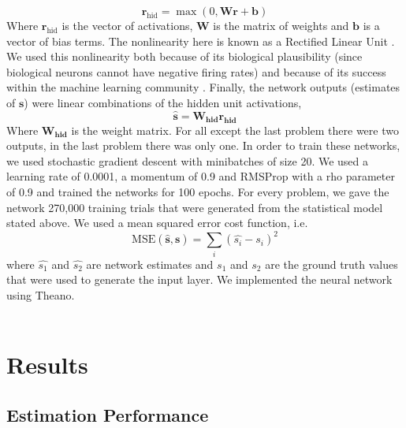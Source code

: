 \documentclass{article} %
\begin{document}
\begin{equation}
	\mathbf{r}_{\text{hid}} = \max(0, \mathbf{Wr + b})
\end{equation}
Where $\mathbf{r}_{\text{hid}}$ is the vector of activations, $\mathbf{W}$ is the matrix of weights and $\mathbf{b}$ is a vector of bias terms. The nonlinearity here is known as a Rectified Linear Unit \cite{NairH10}.
We used this nonlinearity both because of its biological plausibility (since biological neurons cannot have negative firing rates) and because of its success within the machine learning community \cite{Maas2013}.
Finally, the network outputs (estimates of $\mathbf{s}$) were linear combinations of the hidden unit activations,  
\begin{equation}
	\mathbf{\hat{s}} = \mathbf{W_{\text{hid}} r_{\text{hid}}}
\end{equation}
Where $\mathbf{W_{\text{hid}}}$ is the weight matrix. For all except the last problem there were two outputs, in the last problem there was only one. 
In order to train these networks, we used stochastic gradient descent with minibatches of size 20. We used a learning rate of 0.0001, a momentum of 0.9 \cite{Sutskever2013} and RMSProp \cite{Tieleman2012} with a rho parameter of 0.9 and trained the networks for 100 epochs. For every problem, we gave the network 270,000 training trials that were generated from the statistical model stated above. We used a mean squared error cost function, i.e. 
\begin{equation}
	\text{MSE}(\mathbf{\hat{s}, s}) = \sum_i(\hat{s_i} - s_i)^2 
\end{equation}
where $\hat{s_1}$ and $\hat{s_2}$ are network estimates and $s_1$ and $s_2$ are the ground truth values that were used to generate the input layer.
We implemented the neural network using Theano.
\\
\\
\section{Results}
\subsection{Estimation Performance}
\end{document}

